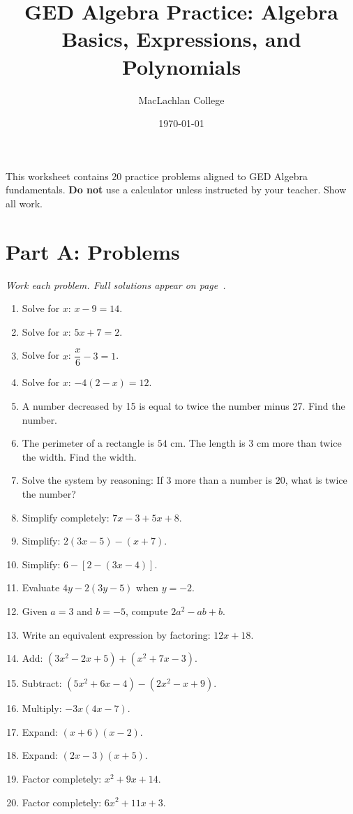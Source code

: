 \documentclass[11pt]{article}
\title{GED Algebra Practice: Algebra Basics, Expressions, and Polynomials}
\author{MacLachlan College}
\date{\today}
\begin{document}
\maketitle
\begin{center}
This worksheet contains 20 practice problems aligned to GED Algebra fundamentals. \textbf{Do not} use a calculator unless instructed by your teacher. Show all work.
\end{center}

\hrulefill

\section*{Part A: Problems}
\textit{Work each problem. Full solutions appear on page~\pageref{sec:solutions}.}

\begin{enumerate}
\item Solve for $x$: $x - 9 = 14$.
\item Solve for $x$: $5x + 7 = 2$.
\item Solve for $x$: $\dfrac{x}{6} - 3 = 1$.
\item Solve for $x$: $-4(2 - x) = 12$.
\item A number decreased by 15 is equal to twice the number minus 27. Find the number.
\item The perimeter of a rectangle is $54$ cm. The length is $3$ cm more than twice the width. Find the width.
\item Solve the system by reasoning: If $3$ more than a number is $20$, what is twice the number?

\item Simplify completely: $7x - 3 + 5x + 8$.
\item Simplify: $2(3x - 5) - (x + 7)$.
\item Simplify: $6 - [2 - (3x - 4)]$.
\item Evaluate $4y - 2(3y - 5)$ when $y = -2$.
\item Given $a=3$ and $b=-5$, compute $2a^2 - ab + b$.
\item Write an equivalent expression by factoring: $12x + 18$.

\item Add: $(3x^2 - 2x + 5) + (x^2 + 7x - 3)$.
\item Subtract: $(5x^2 + 6x - 4) - (2x^2 - x + 9)$.
\item Multiply: $-3x(4x - 7)$.
\item Expand: $(x + 6)(x - 2)$.
\item Expand: $(2x - 3)(x + 5)$.
\item Factor completely: $x^2 + 9x + 14$.
\item Factor completely: $6x^2 + 11x + 3$.
\end{enumerate}
\end{document}
